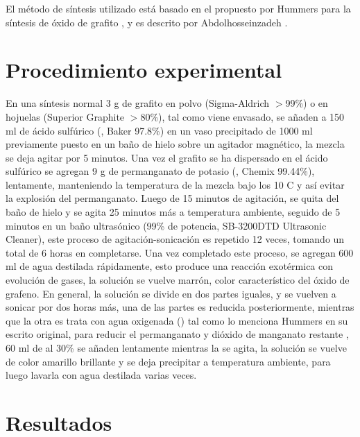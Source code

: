 El método de síntesis utilizado está basado en el propuesto por Hummers para la síntesis de óxido de grafito \citep{Hummers1958}, y es descrito por Abdolhosseinzadeh \citep{Abdolhosseinzadeh2015}.

\section{Procedimiento experimental}
En una síntesis normal 3 g de grafito en polvo (Sigma-Aldrich $>$99\%) o en hojuelas (Superior Graphite $>$80\%), tal como viene envasado, se añaden a 150 ml de ácido sulfúrico (, Baker 97.8\%) en un vaso precipitado de 1000 ml previamente puesto en un baño de hielo sobre un agitador magnético, la mezcla se deja agitar por 5 minutos. Una vez el grafito se ha dispersado en el ácido sulfúrico se agregan 9 g de permanganato de potasio (, Chemix 99.44\%), lentamente, manteniendo la temperatura de la mezcla bajo los 10 C y así evitar la explosión del permanganato. Luego de 15 minutos de agitación, se quita del baño de hielo y se agita 25 minutos más a temperatura ambiente, seguido de 5 minutos en un baño ultrasónico (99\% de potencia, SB-3200DTD Ultrasonic Cleaner), este proceso de agitación-sonicación es repetido 12 veces, tomando un total de 6 horas en completarse. Una vez completado este proceso, se agregan 600 ml de agua destilada rápidamente, esto produce una reacción exotérmica con evolución de gases, la solución se vuelve marrón, color característico del óxido de grafeno. En general, la solución se divide en dos partes iguales, y se vuelven a sonicar por dos horas más, una de las partes es reducida posteriormente, mientras que la otra es trata con agua oxigenada () tal como lo menciona Hummers en su escrito original, para reducir el permanganato y dióxido de manganato restante \citep{Hummers1958}, 60 ml de  al 30\% se añaden lentamente mientras la se agita, la solución se vuelve de color amarillo brillante y se deja precipitar a temperatura ambiente, para luego lavarla con agua destilada varias veces.

\section{Resultados}